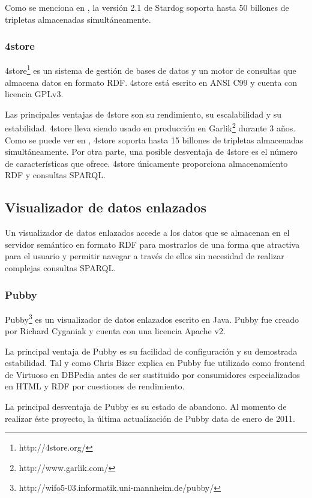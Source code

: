 Como se menciona en \cite[]{largetriplestores}, la versión 2.1 de Stardog soporta hasta 50 billones de tripletas almacenadas simultáneamente.


\subsubsection{4store}
4store\footnote{http://4store.org/} es un sistema de gestión de bases de datos y un motor de consultas que almacena datos en formato RDF. 4store está escrito en ANSI C99 y cuenta con licencia GPLv3.

Las principales ventajas de 4store son su rendimiento, su escalabilidad y su estabilidad. 4store lleva siendo usado en producción en Garlik\footnote{http://www.garlik.com/} durante 3 años. Como se puede ver en \cite[]{largetriplestores}, 4store soporta hasta 15 billones de tripletas almacenadas simultáneamente.
Por otra parte, una posible desventaja de 4store es el número de características que ofrece. 4store únicamente proporciona almacenamiento RDF y consultas SPARQL.



\subsection{Visualizador de datos enlazados}
Un visualizador de datos enlazados accede a los datos que se almacenan en el servidor semántico en formato RDF para mostrarlos de una forma que atractiva para el usuario y permitir navegar a través de ellos sin necesidad de realizar complejas consultas SPARQL.


\subsubsection{Pubby}
Pubby\footnote{http://wifo5-03.informatik.uni-mannheim.de/pubby/} es un visualizador de datos enlazados escrito en Java.  Pubby fue creado por Richard Cyganiak y cuenta con una licencia Apache v2.

La principal ventaja de Pubby es su facilidad de configuración y su demostrada estabilidad. Tal y como Chris Bizer explica en  Pubby fue utilizado como frontend de Virtuoso en DBPedia antes de ser sustituido por consumidores especializados en HTML y RDF por cuestiones de rendimiento.

La principal desventaja de Pubby es su estado de abandono. Al momento de realizar éste proyecto, la última actualización de Pubby data de enero de 2011.

